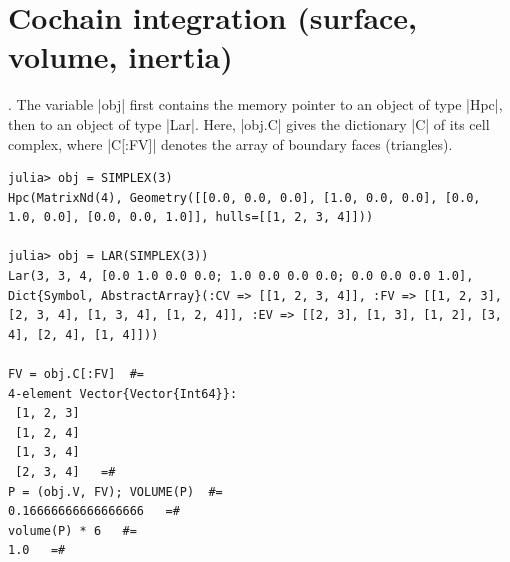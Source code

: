 \section{Cochain integration (surface, volume, inertia)}\label{sect:3-4}






\begin{coding}.
The variable |obj| first contains the memory pointer to an object of type |Hpc|, then to an object of type |Lar|. Here, |obj.C| gives the dictionary |C| of its cell complex, where |C[:FV]| denotes the array of boundary faces (triangles).
\begin{lstlisting}[language=JuliaLocal, style=julia, mathescape = true]
julia> obj = SIMPLEX(3)
Hpc(MatrixNd(4), Geometry([[0.0, 0.0, 0.0], [1.0, 0.0, 0.0], [0.0, 1.0, 0.0], [0.0, 0.0, 1.0]], hulls=[[1, 2, 3, 4]]))

julia> obj = LAR(SIMPLEX(3))
Lar(3, 3, 4, [0.0 1.0 0.0 0.0; 1.0 0.0 0.0 0.0; 0.0 0.0 0.0 1.0], Dict{Symbol, AbstractArray}(:CV => [[1, 2, 3, 4]], :FV => [[1, 2, 3], [2, 3, 4], [1, 3, 4], [1, 2, 4]], :EV => [[2, 3], [1, 3], [1, 2], [3, 4], [2, 4], [1, 4]]))

FV = obj.C[:FV]  #=
4-element Vector{Vector{Int64}}:
 [1, 2, 3]
 [1, 2, 4]
 [1, 3, 4]
 [2, 3, 4]   =#
P = (obj.V, FV); VOLUME(P)  #=
0.16666666666666666   =#
volume(P) * 6   #=
1.0   =#
\end{lstlisting}
\end{coding}


